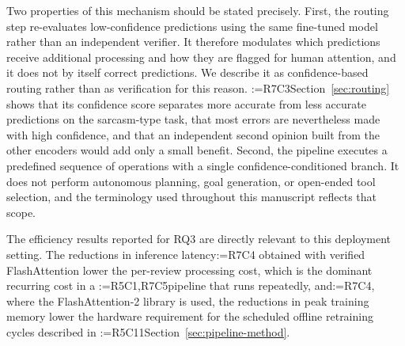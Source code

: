 \documentclass[a4paper,fleqn]{cas-sc}
\makeatletter
\newif\iftracked
\newcommand{\rv@setcolour}[1]{%
  \IfStrEq{#1}{R7C7}{\color{rvEdit}}{%
    \IfSubStr{#1}{R5}{\IfSubStr{#1}{R7}{\color{rvBoth}}{\color{rvFive}}}{\color{rvSeven}}}}
\newcommand{\rv@tag}[1]{\textsuperscript{\sffamily\bfseries\scriptsize[\StrSubstitute{#1}{,}{, }]}\,}
\newcommand{\rv@recordone}[1]{%
  \edef\rv@i{#1}%
  \ifcsdef{rv@n@\rv@i}{}{\csgdef{rv@n@\rv@i}{0}}%
  \csxdef{rv@n@\rv@i}{\the\numexpr\csuse{rv@n@\rv@i}+1\relax}%
  \begingroup\edef\@currentlabel{\rv@i}\label{rv:\rv@i:\csuse{rv@n@\rv@i}}\endgroup}
\newcommand{\rv@record}[1]{\@for\rv@id:=#1\do{\expandafter\rv@recordone\expandafter{\rv@id}}}
\DeclareRobustCommand{\rc}[2]{\rv@record{#1}\iftracked{\rv@setcolour{#1}\rv@tag{#1}#2}\else#2\fi}
\DeclareRobustCommand{\rcdel}[2]{\rv@record{#1}\iftracked{\rv@setcolour{#1}\rv@tag{#1}\rv@strike{#2}}\else\unskip\fi}
\DeclareRobustCommand{\rcrep}[3]{\rv@record{#1}\iftracked{\rv@setcolour{#1}\rv@tag{#1}\rv@strike{#2} #3}\else#3\fi}
\makeatother
\begin{document}
Two properties of this mechanism should be stated precisely. First, the routing step re-evaluates low-confidence predictions using the same fine-tuned model rather than an independent verifier. It therefore modulates which predictions receive additional processing and how they are flagged for human attention, and it does not by itself correct predictions. We describe it as confidence-based routing rather than as verification for this reason. \rcrep{R7C3}{A genuine verification stage would require an independent model, an alternative input view, or an ensemble decision, and its design and evaluation remain future work.}{Section~\ref{sec:routing} shows that its confidence score separates more accurate from less accurate predictions on the sarcasm-type task, that most errors are nevertheless made with high confidence, and that an independent second opinion built from the other encoders would add only a small benefit.} Second, the pipeline executes a predefined sequence of operations with a single confidence-conditioned branch. It does not perform autonomous planning, goal generation, or open-ended tool selection, and the terminology used throughout this manuscript reflects that scope.

The efficiency results reported for RQ3 are directly relevant to this deployment setting. The reductions in inference latency\rcdel{R7C4}{and peak GPU memory} obtained with verified FlashAttention lower the per-review processing cost, which is the dominant recurring cost in a \rcrep{R5C1,R7C5}{continuously operating pipeline}{pipeline that runs repeatedly}, and\rc{R7C4}{, where the FlashAttention-2 library is used,} the reductions in peak training memory lower the hardware requirement for the scheduled offline retraining cycles described in \rcrep{R5C11}{Section 3.7}{Section~\ref{sec:pipeline-method}}.
\end{document}
